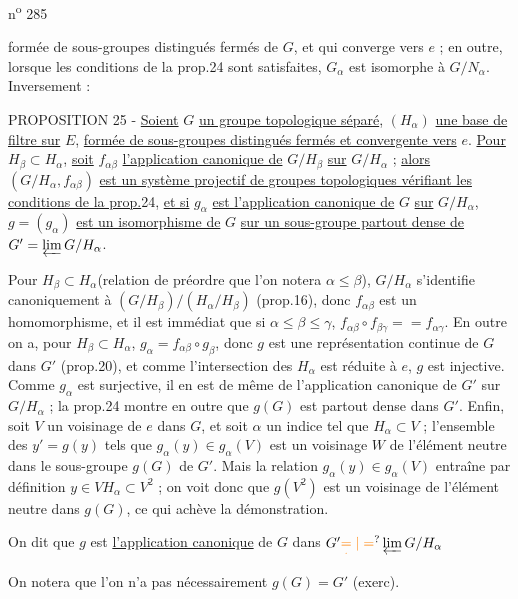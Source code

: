
\hfill n\textsuperscript{o} 285

formée de sous-groupes distingués fermés de $G$, et qui converge vers $e$ ; en outre, lorsque les conditions de la prop.24 sont satisfaites, $G_\alpha$ est isomorphe à $G/N_\alpha$. Inversement :

PROPOSITION 25 - \uline{Soient} $G$ \uline{un groupe topologique séparé}, $(H_\alpha)$ \uline{une base de filtre sur} $E$, \uline{formée de sous-groupes distingués fermés et convergente vers} $e$. \uline{Pour} $H_\beta\subset H_\alpha$, \uline{soit} $f_{\alpha\beta}$ \uline{l'application canonique de} $G/H_\beta$ \uline{sur} $G/H_\alpha$ ; \uline{alors} $(G/H_\alpha,f_{\alpha\beta})$ \uline{est un système projectif de groupes topologiques vérifiant les conditions de la prop.}24, \uline{et si} $g_\alpha$ \uline{est l'application canonique de} $G$ \uline{sur} $G/H_\alpha$, $g=(g_\alpha)$ \uline{est un isomorphisme de} $G$ \uline{sur un sous-groupe partout dense de} $G'=\varprojlim G/H_\alpha$.

Pour $H_\beta\subset H_\alpha$\unsure{;|,}(relation de préordre que l'on notera $\alpha\leq\beta$), $G/H_\alpha$ s'identifie canoniquement à $(G/H_\beta)/(H_\alpha/H_\beta)$ (prop.16), donc $f_{\alpha\beta}$ est un homomorphisme, et il est immédiat que si $\alpha\leq\beta\leq\gamma$, $f_{\alpha\beta}\circ f_{\beta\gamma}={}=f_{\alpha\gamma}$. En outre on a, pour $H_\beta\subset H_\alpha$, $g_\alpha=f_{\alpha\beta}\circ g_\beta$, donc $g$ est une représentation continue de $G$ dans $G'$ (prop.20), et comme l'intersection des $H_\alpha$ est réduite à $e$, $g$ est injective. Comme $g_\alpha$ est surjective, il en est de même de l'application canonique de $G'$ sur $G/H_\alpha$ ; la prop.24 montre en outre que $g(G)$ est partout dense dans $G'$. Enfin, soit $V$ un voisinage de $e$ dans $G$, et soit $\alpha$ un indice tel que $H_\alpha\subset V$ ; l'ensemble des $y'=g(y)$ tels que $g_\alpha(y)\in g_\alpha(V)$ est un voisinage $W$ de l'élément neutre dans le sous-groupe $g(G)$ de $G'$. Mais la relation $g_\alpha(y)\in g_\alpha(V)$ entraîne par définition $y\in VH_\alpha\subset V^2$ ; on voit donc que $g(V^2)$ est un voisinage de l'élément neutre dans $g(G)$, ce qui achève la démonstration.

On dit que $g$ est \uline{l'application canonique} de $G$ dans $G'\unsure{\underset{\cdot}{=}|=}\varprojlim G/H_\alpha$

On notera que l'on n'a pas nécessairement $g(G)=G'$ (exerc).
